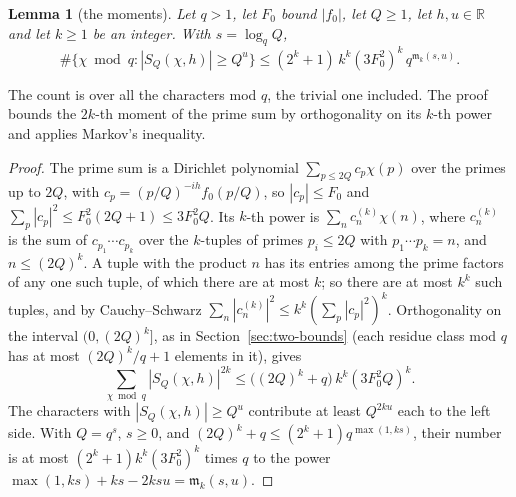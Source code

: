 \documentclass[11pt]{article}
\newtheorem{lemma}[theorem]{Lemma}
\theoremstyle{definition}
\begin{document}
\begin{lemma}[the moments]\label{lem:moments}
Let $q > 1$, let $F_0$ bound $|f_0|$, let $Q \ge 1$, let $h, u \in \mathbb R$ and let $k \ge 1$ be an integer. With $s
= \log_q Q$,
\[
  \#\{\chi \bmod q : |S_Q(\chi, h)| \ge Q^u\} \le (2^k + 1)\, k^k (3F_0^2)^k\, q^{\mathfrak m_k(s, u)}.
\]
\end{lemma}

The count is over all the characters mod $q$, the trivial one included. The proof bounds the $2k$-th moment of the
prime sum by orthogonality on its $k$-th power and applies Markov's inequality.

\begin{proof}
The prime sum is a Dirichlet polynomial $\sum_{p \le 2Q} c_p \chi(p)$ over the primes up to $2Q$, with $c_p =
(p/Q)^{-ih} f_0(p/Q)$, so $|c_p| \le F_0$ and $\sum_p |c_p|^2 \le F_0^2(2Q + 1) \le 3F_0^2 Q$. Its $k$-th power is
$\sum_n c^{(k)}_n \chi(n)$, where $c^{(k)}_n$ is the sum of $c_{p_1} \cdots c_{p_k}$ over the $k$-tuples of primes $p_i
\le 2Q$ with $p_1 \cdots p_k = n$, and $n \le (2Q)^k$. A tuple with the product $n$ has its entries among the prime
factors of any one such tuple, of which there are at most $k$; so there are at most $k^k$ such tuples, and by
Cauchy--Schwarz $\sum_n |c^{(k)}_n|^2 \le k^k (\sum_p |c_p|^2)^k$. Orthogonality on the interval $(0, (2Q)^k]$, as in
Section~\ref{sec:two-bounds} (each residue class mod $q$ has at most $(2Q)^k/q + 1$ elements in it), gives
\[
  \sum_{\chi \bmod q} |S_Q(\chi, h)|^{2k} \le \bigl((2Q)^k + q\bigr)\, k^k (3F_0^2 Q)^k.
\]
The characters with $|S_Q(\chi, h)| \ge Q^u$ contribute at least $Q^{2ku}$ each to the left side. With $Q = q^s$, $s
\ge 0$, and $(2Q)^k + q \le (2^k + 1) q^{\max(1, ks)}$, their number is at most $(2^k + 1) k^k (3F_0^2)^k$ times $q$ to
the power $\max(1, ks) + ks - 2ksu = \mathfrak m_k(s, u)$.
\end{proof}
\end{document}
